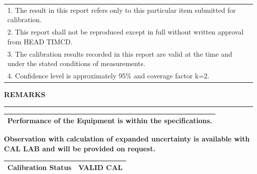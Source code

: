 \documentclass[a4paper,10pt]{article}
\newcommand{\sectiontitle}[1]
{
\vspace{2mm}

{\large\bfseries #1}

\vspace{0.5mm}

\hrule

\vspace{1.5mm}
}
\begin{document}
\begin{tabularx}{\textwidth}{|X|}
\hline

1. The result in this report refers only to this particular item submitted for calibration.
\\[1mm]

2. This report shall not be reproduced except in full without written approval from HEAD TIMCD.
\\[1mm]

3. The calibration results recorded in this report are valid at the time and under the stated conditions of measurements.
\\[1mm]

4. Confidence level is approximately 95\% and coverage factor k=2.
\\[1mm]

\hline

\end{tabularx}

\vspace{3mm}


\sectiontitle{ REMARKS}

\begin{tabularx}{\textwidth}{|X|}
\hline

Performance of the Equipment is within the specifications.

\\[4mm]

\hline

\end{tabularx}

\vspace{2mm}

\noindent
\textbf{Observation with calculation of expanded uncertainty is available with CAL LAB and will be provided on request.}

\vspace{5mm}


\begin{tabularx}{\textwidth}{|>{\bfseries}l|X|}
\hline

Calibration Status &
VALID CAL

\\
\hline

\end{tabularx}
\end{document}
